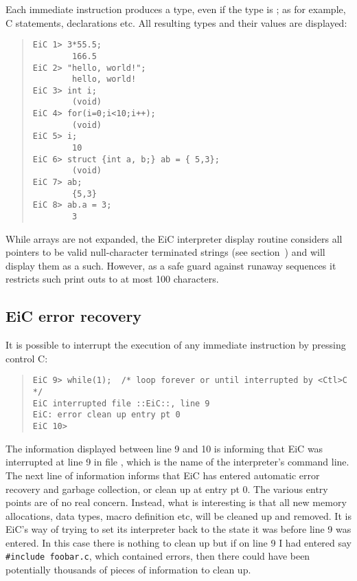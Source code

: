 Each immediate instruction produces a type, even if the type is 
; as for example, C statements, declarations etc. 
All resulting types and their values are displayed:


\begin{quote}
\begin{verbatim}
EiC 1> 3*55.5;
        166.5
EiC 2> "hello, world!";
        hello, world!
EiC 3> int i;
        (void)
EiC 4> for(i=0;i<10;i++);
        (void)
EiC 5> i;
        10
EiC 6> struct {int a, b;} ab = { 5,3};
        (void)
EiC 7> ab;
        {5,3}
EiC 8> ab.a = 3;
        3
\end{verbatim}
\end{quote}

While arrays are not expanded, the EiC interpreter display routine
considers all  pointers to be valid null-character terminated
strings (see section~) and will display them
as a such. However, as a safe guard against runaway sequences it 
restricts such print outs to at most 100 characters. 


\subsection{EiC error recovery}
\label{sec:ErrorRecovery}

It is possible to interrupt the
execution of any immediate instruction by pressing control C:

\begin{quote}
\begin{verbatim}
EiC 9> while(1);  /* loop forever or until interrupted by <Ctl>C */ 
EiC interrupted file ::EiC::, line 9
EiC: error clean up entry pt 0
EiC 10> 
\end{verbatim}
\end{quote}

The information displayed between line 9 and 10 is informing that EiC
was interrupted at line 9 in file , which is the name of
the interpreter's command line. The next line of information informs
that EiC has entered automatic error recovery and garbage
collection, or clean up at entry pt 0. The
various entry points are of no real concern. Instead, what is
interesting is that all new memory allocations, data types, macro
definition etc, will be cleaned up and removed. It is EiC's way of
trying to set its interpreter back to the state it was before line 9
was entered. In this case there is nothing to clean up but if on
line 9 I had entered say \verb+#include foobar.c+, which contained
errors, then there could have been potentially thousands of pieces of
information to clean up.

